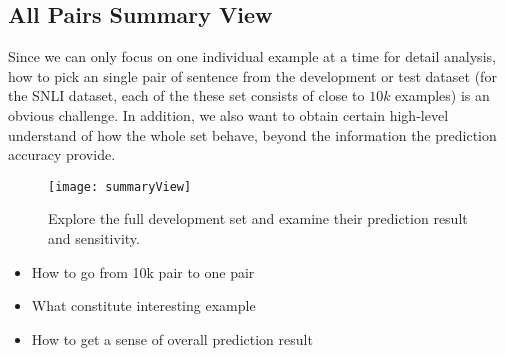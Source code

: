\subsection{All Pairs Summary View}
\label{sec:allPairs}
Since we can only focus on one individual example at a time for detail analysis,
how to pick an single pair of sentence from the development or test dataset (for the SNLI dataset, each of the these set consists of close to $10k$ examples) is an obvious challenge.
%
In addition, we also want to obtain certain high-level understand of how the whole set behave, beyond the information the prediction accuracy provide.

\begin{figure}[htbp]
\centering
\vspace{-2mm}
 \texttt{[image: summaryView]}
 \caption{Explore the full development set and examine their prediction result and sensitivity.}
\label{fig:modelPipeline}
\end{figure}

\begin{itemize}
\item How to go from 10k pair to one pair
\item What constitute interesting example
\item How to get a sense of overall prediction result
\end{itemize}
